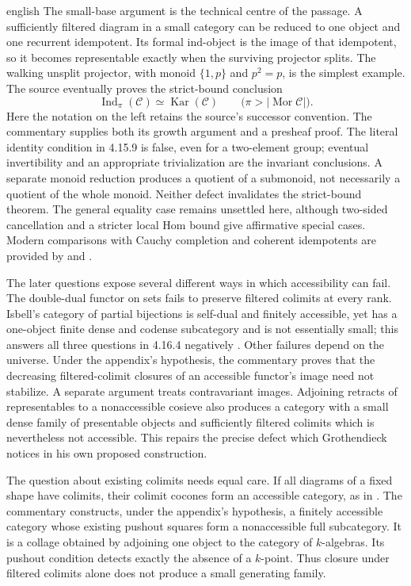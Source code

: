 \begin{otherlanguage*}{english}
The small-base argument is the technical centre of the passage. A sufficiently filtered diagram in a small category can be reduced to one object and one recurrent idempotent. Its formal ind-object is the image of that idempotent, so it becomes representable exactly when the surviving projector splits. The walking unsplit projector, with monoid $\{1,p\}$ and $p^2=p$, is the simplest example. The source eventually proves the strict-bound conclusion
\[
 \operatorname{Ind}_{\pi}(\mathcal C)\simeq
 \operatorname{Kar}(\mathcal C)
 \qquad\bigl(\pi>|\operatorname{Mor}\mathcal C|\bigr).
\]
Here the notation on the left retains the source's successor convention. The commentary supplies both its growth argument and a presheaf proof. The literal identity condition in 4.15.9 is false, even for a two-element group; eventual invertibility and an appropriate trivialization are the invariant conclusions. A separate monoid reduction produces a quotient of a submonoid, not necessarily a quotient of the whole monoid. Neither defect invalidates the strict-bound theorem. The general equality case remains unsettled here, although two-sided cancellation and a stricter local Hom bound give affirmative special cases. Modern comparisons with Cauchy completion and coherent idempotents are provided by \citet{Tendas2022Continuity} and \citet[Sections~5.4.2--5.4.3]{Lurie2009HTT}.

The later questions expose several different ways in which accessibility can fail. The double-dual functor on sets fails to preserve filtered colimits at every rank. Isbell's category of partial bijections is self-dual and finitely accessible, yet has a one-object finite dense and codense subcategory and is not essentially small; this answers all three questions in 4.16.4 negatively \citep[Example~8.7]{AveryLeinster2021}. Other failures depend on the universe. Under the appendix's hypothesis, the commentary proves that the decreasing filtered-colimit closures of an accessible functor's image need not stabilize. A separate argument treats contravariant images. Adjoining retracts of representables to a nonaccessible cosieve also produces a category with a small dense family of presentable objects and sufficiently filtered colimits which is nevertheless not accessible. This repairs the precise defect which Grothendieck notices in his own proposed construction.

The question about existing colimits needs equal care. If all diagrams of a fixed shape have colimits, their colimit cocones form an accessible category, as in \citet[Example~5.4.7.9]{Lurie2009HTT}. The commentary constructs, under the appendix's hypothesis, a finitely accessible category whose existing pushout squares form a nonaccessible full subcategory. It is a collage obtained by adjoining one object to the category of $k$-algebras. Its pushout condition detects exactly the absence of a $k$-point. Thus closure under filtered colimits alone does not produce a small generating family.


\end{otherlanguage*}
